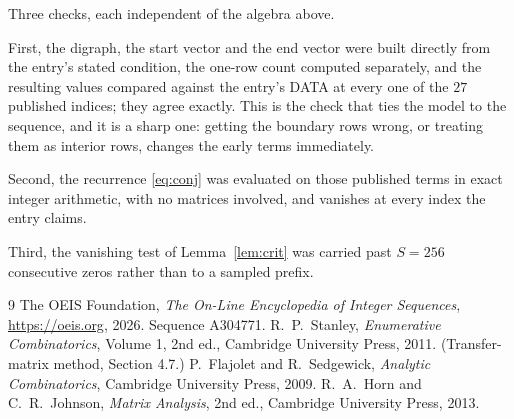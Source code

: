 \documentclass[11pt,a4paper]{article}
\theoremstyle{plain}
\theoremstyle{definition}
\begin{document}
Three checks, each independent of the algebra above.

First, the digraph, the start vector and the end vector were built directly from the
entry's stated condition, the one-row count computed separately, and the resulting values
compared against the entry's DATA at every one of the $27$ published indices; they
agree exactly. This is the check that ties the model to the sequence, and it is a sharp one:
getting the boundary rows wrong, or treating them as interior rows, changes the early terms
immediately.

Second, the recurrence \eqref{eq:conj} was evaluated on those published terms in exact
integer arithmetic, with no matrices involved, and vanishes at every index the entry claims.

Third, the vanishing test of Lemma~\ref{lem:crit} was carried past $S=256$ consecutive
zeros rather than to a sampled prefix.

\begin{thebibliography}{9}
 The OEIS Foundation, \emph{The On-Line Encyclopedia of Integer
Sequences}, \url{https://oeis.org}, 2026. Sequence A304771.
 R.~P.~Stanley, \emph{Enumerative Combinatorics}, Volume 1, 2nd ed.,
Cambridge University Press, 2011. (Transfer-matrix method, Section 4.7.)
 P.~Flajolet and R.~Sedgewick, \emph{Analytic Combinatorics}, Cambridge
University Press, 2009.
 R.~A.~Horn and C.~R.~Johnson, \emph{Matrix Analysis}, 2nd ed., Cambridge
University Press, 2013.
\end{thebibliography}
\end{document}
